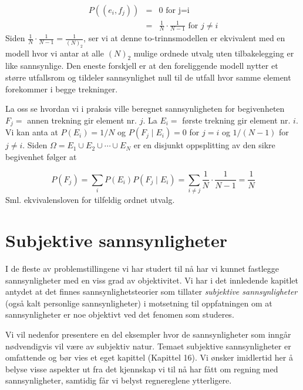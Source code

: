 \begin{eqnarray*}
   P((e_i,f_j))&=&0   \mbox{   for j=i  } \\
              &=&\frac{1}{N} \cdot \frac{1}{N-1} \mbox{   for }j \ne i
\end{eqnarray*}
Siden  $\frac{1}{N} \cdot \frac{1}{N-1}=\frac{1}{(N)_2}$, ser vi at denne to-trinnsmodellen er
ekvivalent med en modell hvor vi antar at alle $(N)_2$ mulige
ordnede utvalg uten tilbakelegging er like sannsynlige. Den
eneste forskjell er at den foreliggende modell nytter et større
utfallsrom og tildeler sannsynlighet null til de utfall hvor
samme element forekommer i begge trekninger.

La oss se hvordan vi i praksis ville beregnet sannsynligheten for
begivenheten $F_j=$ annen trekning gir element nr. $j$.
La $E_i=$ første trekning gir element nr. $i$. Vi kan anta at
$P(E_i)=1/N$  og $P(F_j \mid E_i)=0$ for $j=i$ og $1/(N-1)$ for $j \ne i$. 
Siden $\Omega =E_1 \cup E_2 \cup \cdots \cup E_N$ er en disjunkt
oppsplitting av den sikre begivenhet følger at

\[ P(F_j)=\sum_{i}P(E_i)P(F_j \mid E_i)=
                       \sum_{i \ne j}\frac{1}{N} \cdot \frac{1}{N-1}=\frac{1}{N} \]
Sml. ekvivalensloven for tilfeldig ordnet utvalg. 

\normalsize

\section{Subjektive sannsynligheter}

I de fleste av problemstillingene vi har studert til nå har vi
kunnet fastlegge sannsynligheter med en viss grad av
objektivitet. Vi har i det innledende kapitlet antydet at det
finnes sannsynlighetsteorier som tillater {\em subjektive
sannsynligheter} (også kalt personlige sannsynligheter) i
motsetning til oppfatningen om at sannsynligheter er noe
objektivt ved det fenomen som studeres.

Vi vil nedenfor presentere en del eksempler hvor de sannsynligheter som
inngår nødvendigvis vil være av subjektiv natur. Temaet subjektive
sannsynligheter er omfattende og bør vies et eget kapittel (Kapittel 16).
Vi ønsker imidlertid her å belyse
visse aspekter ut fra det kjennskap vi til nå har fått om regning
med sannsynligheter, samtidig får vi belyst regnereglene ytterligere.

